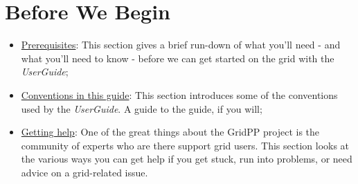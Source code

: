 \section{Before We Begin}\label{before-we-begin}

\begin{itemize}
\tightlist
\item
  \href{prerequisites.html}{Prerequisites}: This section gives a brief
  run-down of what you'll need - and what you'll need to know - before
  we can get started on the grid with the \emph{UserGuide};
\item
  \href{conventions.html}{Conventions in this guide}: This section
  introduces some of the conventions used by the \emph{UserGuide}. A
  guide to the guide, if you will;
\item
  \href{getting-help.html}{Getting help}: One of the great things about
  the GridPP project is the community of experts who are there support
  grid users. This section looks at the various ways you can get help if
  you get stuck, run into problems, or need advice on a grid-related
  issue.
\end{itemize}
